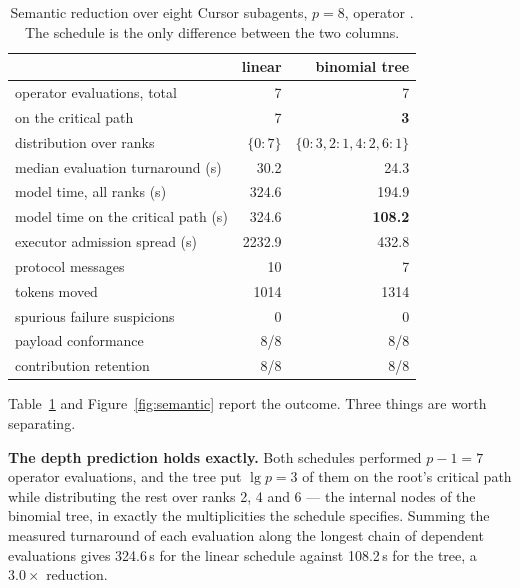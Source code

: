 \begin{table}[t]
\centering
\small
\caption{Semantic reduction over eight Cursor subagents, $p=8$, operator
. The schedule is the only difference between the two
columns.}
\label{tab:semantic}
\begin{tabular}{@{}lrr@{}}
\toprule
 & linear & binomial tree \\
\midrule
operator evaluations, total      & 7      & 7 \\
\quad on the critical path       & 7      & \textbf{3} \\
\quad distribution over ranks    & $\{0{:}7\}$ & $\{0{:}3, 2{:}1, 4{:}2, 6{:}1\}$ \\
median evaluation turnaround (s) & 30.2   & 24.3 \\
model time, all ranks (s)        & 324.6  & 194.9 \\
model time on the critical path (s) & 324.6 & \textbf{108.2} \\
executor admission spread (s)    & 2232.9 & 432.8 \\
protocol messages                & 10     & 7 \\
tokens moved                     & 1014   & 1314 \\
spurious failure suspicions      & 0      & 0 \\
payload conformance              & 8/8    & 8/8 \\
contribution retention           & 8/8    & 8/8 \\
\bottomrule
\end{tabular}
\end{table}

Table~\ref{tab:semantic} and Figure~\ref{fig:semantic} report the outcome.
Three things are worth separating.

\textbf{The depth prediction holds exactly.}  Both schedules performed
$p-1 = 7$ operator evaluations, and the tree put $\lg p = 3$ of them on the
root's critical path while distributing the rest over ranks 2, 4 and 6 --- the
internal nodes of the binomial tree, in exactly the multiplicities the schedule
specifies.  Summing the measured turnaround of each evaluation along the
longest chain of dependent evaluations gives 324.6\,s for the linear schedule
against 108.2\,s for the tree, a $3.0\times$ reduction.

